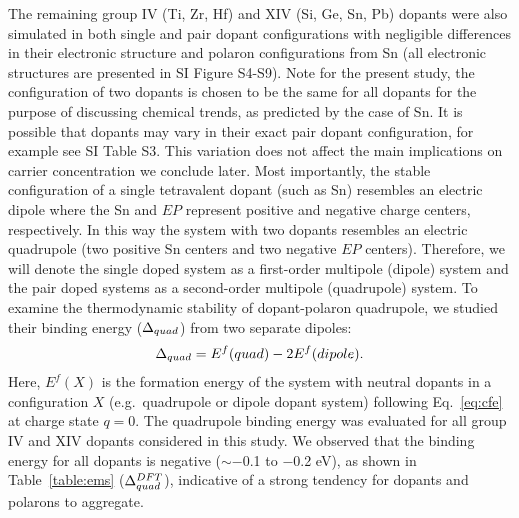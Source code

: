 The remaining group IV (Ti, Zr, Hf) and XIV (Si, Ge, Sn, Pb) dopants were also simulated in both single and pair dopant configurations with negligible differences in their electronic structure
and polaron configurations from Sn (all electronic structures are presented in SI Figure S4-S9).
Note for the present study, the configuration of two dopants is chosen to be the same for all dopants for the purpose of discussing chemical trends, as predicted by the case of Sn. It is possible that dopants may vary in their exact pair dopant configuration, for example see SI Table S3. This variation does not affect the main implications on carrier concentration we conclude later.
Most importantly, the stable configuration of a single tetravalent dopant (such as Sn) resembles an electric dipole where the Sn and $EP$ represent positive and negative charge centers, respectively. In this way the system with two dopants resembles an electric quadrupole (two positive Sn centers and two negative $EP$ centers).
Therefore, we will denote the single doped system as a first-order multipole (dipole) system and the pair doped systems as a second-order multipole (quadrupole) system.
To examine the thermodynamic stability of dopant-polaron quadrupole, we studied their binding energy ($\Delta_{quad}$) from two separate dipoles:
\begin{align}
    \Delta_{quad} = E^f(quad) - 2 E^f(dipole).
    \label{eq:be1}
\end{align}
Here, $E^f(X)$ is the formation energy of the system with neutral dopants in a configuration $X$ (e.g.\ quadrupole or dipole dopant system) following Eq.~\ref{eq:cfe} at charge state $q=0$.
The quadrupole binding energy was evaluated for all group IV and XIV dopants considered in this study. We observed that the binding energy for all dopants is negative ($\sim-$0.1 to $-$0.2 eV), as shown in Table~\ref{table:ems} ($\Delta_{quad}^{DFT}$), indicative of a strong tendency for dopants and polarons to aggregate.
